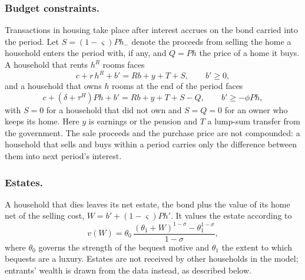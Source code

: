 \subsubsection*{Budget constraints.}
Transactions in housing take place after interest accrues on the bond carried
into the period. Let $S=(1-\varsigma)P h_{-}$ denote the proceeds from selling the
home a household enters the period with, if any, and $Q=Ph$ the price of a home
it buys. A household that rents $h^R$ rooms faces
\begin{equation}
 c+r\,h^R+b'=Rb+y+T+S,
 \qquad b'\geq0,
 \label{eq:m5-bc-rent}
\end{equation}
and a household that owns $h$ rooms at the end of the period faces
\begin{equation}
 c+(\delta+\tau^H)P h+b'=Rb+y+T+S-Q,
 \qquad b'\geq-\phi Ph,
 \label{eq:m5-bc-own}
\end{equation}
with $S=0$ for a household that did not own and $S=Q=0$ for an owner who
keeps its home. Here $y$ is earnings or the pension and $T$ a lump-sum
transfer from the government. The sale proceeds and the purchase price are not
compounded: a household that sells and buys within a period carries only the
difference between them into next period's interest.

\subsubsection*{Estates.}
A household that dies leaves its net estate, the bond plus the value of its
home net of the selling cost, $W=b'+(1-\varsigma)Ph'$. It values the estate
according to
\begin{equation}
 v(W)=\theta_0\,\frac{(\theta_1+W)^{1-\sigma}-\theta_1^{1-\sigma}}{1-\sigma},
 \label{eq:m5-bequest}
\end{equation}
where $\theta_0$ governs the strength of the bequest motive and $\theta_1$ the
extent to which bequests are a luxury. Estates are not received by other
households in the model; entrants' wealth is drawn from the data instead, as
described below.

